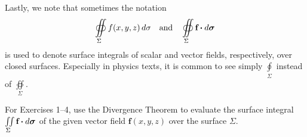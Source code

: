 Lastly, we note that sometimes the notation
\begin{displaymath}
 \oiint\limits_{\Sigma} f(x,y,z)\,d\sigma \quad\text{and}\quad \oiint\limits_{\Sigma} \textbf{f} \bm{\cdot} d\bm{\sigma}
\end{displaymath}
is used to denote surface integrals of scalar and vector fields, respectively, over closed
surfaces.\index{$\oiint\limits_{\Sigma}$} Especially in physics texts, it is common to see simply
$\oint\limits_{\Sigma}$ instead of $\oiint\limits_{\Sigma}$.

\startexercises\label{sec4dot4}
\par\noindent For Exercises 1--4, use the Divergence Theorem to evaluate the surface integral
$\iint\limits_{\Sigma} \textbf{f} \bm{\cdot} d\bm{\sigma}$ of the given vector field $\textbf{f}(x,y,z)$ over the
surface $\Sigma$.
